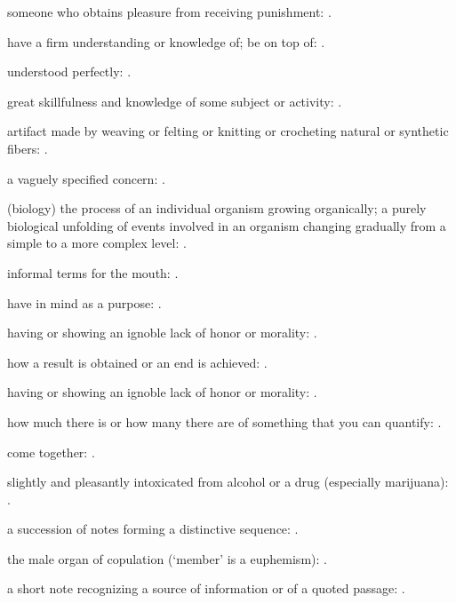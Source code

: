   someone who obtains pleasure from receiving punishment: .

  have a firm understanding or knowledge of; be on top of: .

  understood perfectly: .

  great skillfulness and knowledge of some subject or activity: .

  artifact made by weaving or felting or knitting or crocheting natural or synthetic fibers: .

  a vaguely specified concern: .

  (biology) the process of an individual organism growing organically; a purely biological unfolding of events involved in an organism changing gradually from a simple to a more complex level: .

  informal terms for the mouth: .

  have in mind as a purpose: .

  having or showing an ignoble lack of honor or morality: .

  how a result is obtained or an end is achieved: .

  having or showing an ignoble lack of honor or morality: .

  how much there is or how many there are of something that you can quantify: .

  come together: .

  slightly and pleasantly intoxicated from alcohol or a drug (especially marijuana): .

  a succession of notes forming a distinctive sequence: .

  the male organ of copulation (`member' is a euphemism): .

  a short note recognizing a source of information or of a quoted passage: .

